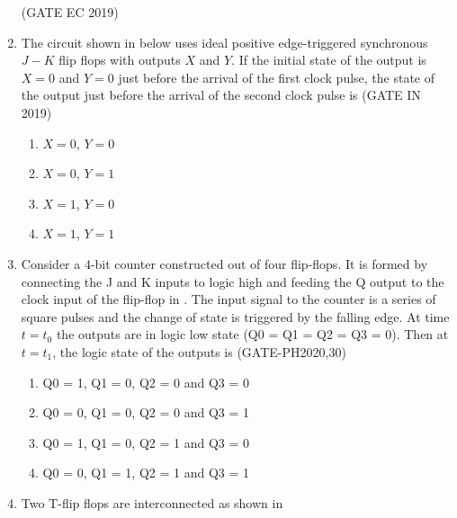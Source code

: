\begin{enumerate}[label=\arabic*.,ref=\theenumi]
		\hfill(GATE EC 2019)
	\begin{figure}[H]
    \centering
    \resizebox{0.75\columnwidth}{!}{%
			
			}
    \caption{}
	\label{fig:GATE-EC2019,25}
\end{figure}
%
 \item The circuit shown in 
below uses ideal positive edge-triggered synchronous $J-K$ flip flops with outputs $X$ and $Y$. If the initial state of the output is $X=0$ and $Y=0$ just before the arrival of the first clock pulse, the state of the output just before the arrival of the second clock pulse is
              \hfill(GATE IN 2019)
\begin{enumerate}
    \item $X=0$, $Y=0$
    \item $X=0$, $Y=1$
    \item $X=1$, $Y=0$
    \item$X=1$, $Y=1$
\end{enumerate}
	\begin{figure}[H]
    \centering
    \resizebox{0.75\columnwidth}{!}{%
    
	}
    \caption{}
	\label{fig:GATE-IN2019,12}
\end{figure}
%
\item Consider a $4$-bit counter constructed out of four flip-flops. It is formed by connecting the J and K inputs to logic high and feeding the Q output to the clock input of the flip-flop in 
	.
 The input signal to the counter is a series of square pulses and the change of state is triggered by the falling edge. At time $t=t_0$ the outputs are in logic low state (Q0 = Q1 = Q2 = Q3 = 0). Then at $t=t_1$, the logic state of the outputs is 
		               \hfill(GATE-PH2020,30)
\begin{enumerate}
\item  Q0 = 1, Q1 = 0, Q2 = 0 and Q3 = 0 
\item  Q0 = 0, Q1 = 0, Q2 = 0 and Q3 = 1
\item  Q0 = 1, Q1 = 0, Q2 = 1 and Q3 = 0
\item  Q0 = 0, Q1 = 1, Q2 = 1 and Q3 = 1
\end{enumerate}
\begin{figure}[H]
    \centering
    \resizebox{0.75\columnwidth}{!}{%

	}
    \caption{}
	\label{fig:GATE-PH2020,30}
\end{figure}
%
\item Two T-flip flops are interconnected as shown in 

\end{enumerate}
